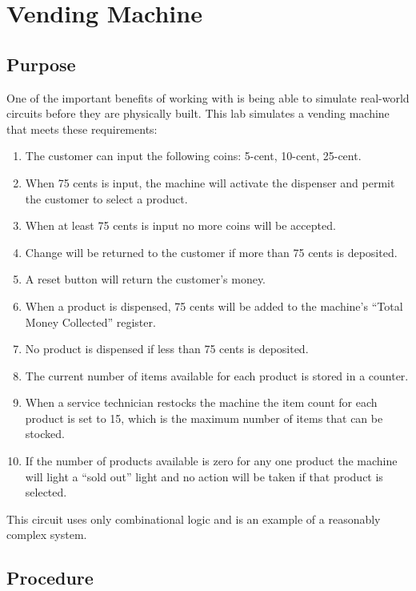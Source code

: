 \chapter{Vending Machine}\label{vend}

\section{Purpose}

One of the important benefits of working with \LE is being able to simulate real-world circuits before they are physically built. This lab simulates a vending machine that meets these requirements:

\begin{enumerate}
	\item The customer can input the following coins: 5-cent, 10-cent, 25-cent.
	\item When 75 cents is input, the machine will activate the dispenser and permit the customer to select a product.
	\item When at least 75 cents is input no more coins will be accepted.
	\item Change will be returned to the customer if more than 75 cents is deposited.
	\item A reset button will return the customer's money.
	\item When a product is dispensed, 75 cents will be added to the machine's ``Total Money Collected'' register.
	\item No product is dispensed if less than 75 cents is deposited.
	\item The current number of items available for each product is stored in a counter.
	\item When a service technician restocks the machine the item count for each product is set to 15, which is the maximum number of items that can be stocked.
	\item If the number of products available is zero for any one product the machine will light a ``sold out'' light and no action will be taken if that product is selected.
\end{enumerate}

This circuit uses only combinational logic and is an example of a reasonably complex system. 

\section{Procedure}

